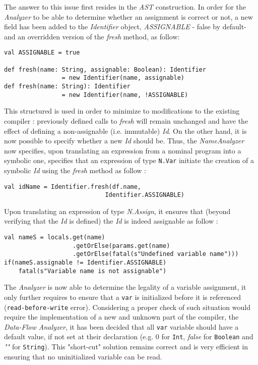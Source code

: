 The answer to this issue first resides in the \textit{AST} construction. In order for the \textit{Analyzer} to be able to determine whether an assignment is correct or not, a new field has been added to the \textit{Identifier} object, \textit{ASSIGNABLE} - false by default- and an overridden version of the \textit{fresh} method, as follow:
\begin{lstlisting}
val ASSIGNABLE = true

def fresh(name: String, assignable: Boolean): Identifier
                = new Identifier(name, assignable)
def fresh(name: String): Identifier 
                = new Identifier(name, !ASSIGNABLE)
\end{lstlisting}
This structured is used in order to minimize to modifications to the existing compiler : previously defined calls to \textit{fresh} will remain unchanged and have the effect of defining a non-assignable (i.e. immutable) \textit{Id}. On the other hand, it is now possible to specify whether a new \textit{Id} should be. Thus, the \textit{NameAnalyzer} now specifies, upon translating an expression from a nominal program into a symbolic one, specifies that an expression of type \texttt{N.Var} initiate the creation of a symbolic \textit{Id} using the \textit{fresh} method as follow :
\begin{lstlisting}
val idName = Identifier.fresh(df.name, 
                            Identifier.ASSIGNABLE)
\end{lstlisting}
Upon translating an expression of type \textit{N.Assign}, it ensures that (beyond verifying that the \textit{Id} is defined) the \textit{Id} is indeed assignable as follow :
\begin{lstlisting}
val nameS = locals.get(name)
                   .getOrElse(params.get(name)
                   .getOrElse(fatal(s"Undefined variable name")))
if(nameS.assignable != Identifier.ASSIGNABLE)
    fatal(s"Variable name is not assignable")
\end{lstlisting}

The \textit{Analyzer} is now able to determine the legality of a variable assignment, it only further requires to ensure that a \texttt{var} is initialized before it is referenced (\texttt{read-before-write} error). Considering a proper check of such situation would require the implementation of a new and unknown part of the compiler, the \textit{Data-Flow Analyzer}, it has been decided that all \texttt{var} variable should have a default value, if not set at their declaration (e.g. 0 for \texttt{Int}, \textit{false} for \texttt{Boolean} and \textit{""} for \texttt{String}). This "short-cut" solution remains correct and is very efficient in ensuring that no uninitialized variable can be read.

